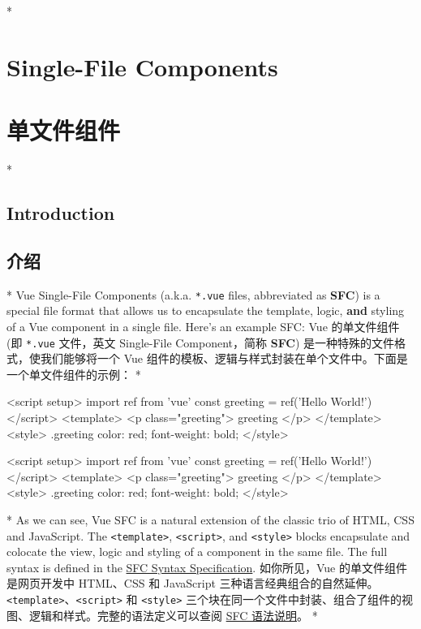 \begin{paracol}{2}
 
\switchcolumn[0]*%
\section{Single-File Components}
\switchcolumn
\section{单文件组件}
\switchcolumn[0]*%
\subsection{Introduction}
\switchcolumn
\subsection{介绍}
\switchcolumn[0]*%
Vue Single-File Components (a.k.a. \texttt{*.vue} files, abbreviated as
\textbf{SFC}) is a special file format that allows us to encapsulate the
template, logic, \textbf{and} styling of a Vue component in a single
file. Here's an example SFC:
\switchcolumn
Vue 的单文件组件 (即 \texttt{*.vue} 文件，英文 Single-File
Component，简称 \textbf{SFC}) 是一种特殊的文件格式，使我们能够将一个 Vue
组件的模板、逻辑与样式封装在单个文件中。下面是一个单文件组件的示例：
\switchcolumn[0]*%
\begin{codeHtml}
<script setup>
import { ref } from 'vue'
const greeting = ref('Hello World!')
</script>
<template>
  <p class="greeting">{{ greeting }}</p>
</template>
<style>
.greeting {
  color: red;
  font-weight: bold;
}
</style>
\end{codeHtml}
\switchcolumn
\begin{codeHtml}
<script setup>
import { ref } from 'vue'
const greeting = ref('Hello World!')
</script>
<template>
  <p class="greeting">{{ greeting }}</p>
</template>
<style>
.greeting {
  color: red;
  font-weight: bold;
}
</style>
\end{codeHtml}
\switchcolumn[0]*%
As we can see, Vue SFC is a natural extension of the classic trio of
HTML, CSS and JavaScript. The
\texttt{\textless{}template\textgreater{}},
\texttt{\textless{}script\textgreater{}}, and
\texttt{\textless{}style\textgreater{}} blocks encapsulate and colocate
the view, logic and styling of a component in the same file. The full
syntax is defined in the \href{https://vuejs.org/api/sfc-spec.html}{SFC
Syntax Specification}.
\switchcolumn
如你所见，Vue 的单文件组件是网页开发中 HTML、CSS 和 JavaScript
三种语言经典组合的自然延伸。\texttt{\textless{}template\textgreater{}}、\texttt{\textless{}script\textgreater{}}
和 \texttt{\textless{}style\textgreater{}}
三个块在同一个文件中封装、组合了组件的视图、逻辑和样式。完整的语法定义可以查阅
\href{https://cn.vuejs.org/api/sfc-spec.html}{SFC 语法说明}。
\switchcolumn[0]*%

\end{paracol}
